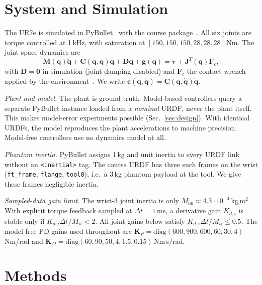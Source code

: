 \documentclass[conference]{IEEEtran}
\newcommand{\bq}{\boldsymbol{q}}
\newcommand{\dq}{\dot{\boldsymbol{q}}}
\newcommand{\ddq}{\ddot{\boldsymbol{q}}}
\newcommand{\btau}{\boldsymbol{\tau}}
\newcommand{\bM}{\boldsymbol{M}}
\newcommand{\bJ}{\boldsymbol{J}}
\newcommand{\bK}{\boldsymbol{K}}
\newcommand{\bD}{\boldsymbol{D}}
\newcommand{\bF}{\boldsymbol{F}}
\newcommand{\bc}{\boldsymbol{c}}
\newcommand{\bC}{\boldsymbol{C}}
\newcommand{\bg}{\boldsymbol{g}}
\begin{document}
\section{System and Simulation}\label{sec:system}
The UR7e is simulated in PyBullet~\cite{pybullet} with the course package~\cite{moret2026}. All six joints are torque controlled at 1\,kHz, with saturation at $[150,150,150,28,28,28]$\,Nm. The joint-space dynamics are
\begin{equation}
\bM(\bq)\ddq + \bC(\bq,\dq)\dq + \bD\dq + \bg(\bq) = \btau + \bJ^T(\bq)\bF_c,
\label{eq:dyn}
\end{equation}
with $\bD=\boldsymbol{0}$ in simulation (joint damping disabled) and $\bF_c$ the contact wrench applied by the environment~\cite{carloni2026}. We write $\bc(\bq,\dq)=\bC(\bq,\dq)\dq$.

\emph{Plant and model.} The plant is ground truth. Model-based controllers query a separate PyBullet instance loaded from a \emph{nominal} URDF, never the plant itself. This makes model-error experiments possible (Sec.~\ref{sec:design}). With identical URDFs, the model reproduces the plant accelerations to machine precision. Model-free controllers use no dynamics model at all.

\emph{Phantom inertia.} PyBullet assigns 1\,kg and unit inertia to every URDF link without an \texttt{<inertial>} tag. The course URDF has three such frames on the wrist (\texttt{ft\_frame}, \texttt{flange}, \texttt{tool0}), i.e.\ a 3\,kg phantom payload at the tool. We give these frames negligible inertia.

\emph{Sampled-data gain limit.} The wrist-3 joint inertia is only $M_{66}\approx4.3\cdot10^{-4}$\,kg\,m$^2$. With explicit torque feedback sampled at $\Delta t=1$\,ms, a derivative gain $K_{d,i}$ is stable only if $K_{d,i}\Delta t/M_{ii}<2$. All joint gains below satisfy $K_{d,i}\Delta t/M_{ii}\le0.5$. The model-free PD gains used throughout are $\bK_P=\mathrm{diag}(600,900,600,60,30,4)$\,Nm/rad and $\bK_D=\mathrm{diag}(60,90,50,4,1.5,0.15)$\,Nm\,s/rad.

\section{Methods}\label{sec:methods}
\end{document}
